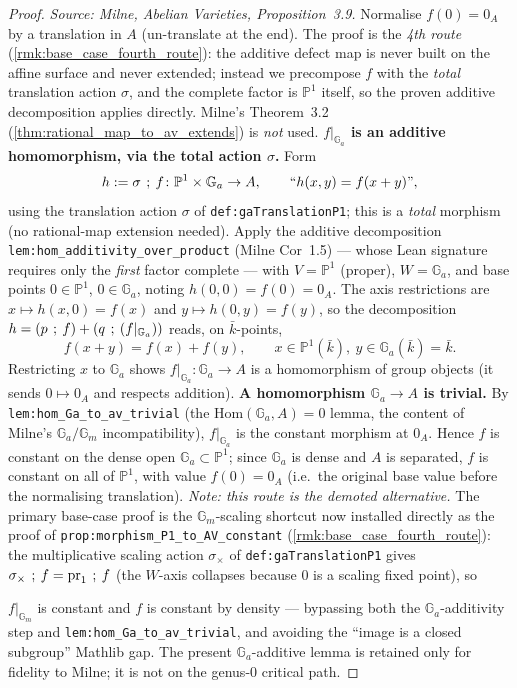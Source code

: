 \begin{proof}
  \textit{Source: Milne, Abelian Varieties, Proposition~3.9.}
  Normalise \(f(0) = 0_A\) by a translation in \(A\) (un-translate at the end). The proof is the
  \emph{4th route} (\cref{rmk:base_case_fourth_route}): the additive defect map is never built on
  the affine surface and never extended; instead we precompose \(f\) with the \emph{total}
  translation action \(\sigma\), and the complete factor is \(\mathbb P^1\) itself, so the proven
  additive decomposition applies directly. Milne's Theorem~3.2
  (\cref{thm:rational_map_to_av_extends}) is \emph{not} used.
  \textbf{\(f|_{\mathbb G_a}\) is an additive homomorphism, via the total action \(\sigma\).} Form
  \[ h := \sigma \fatsemi f \colon \mathbb P^1 \times \mathbb G_a \to A, \qquad
     \text{``}h(x, y) = f(x + y)\text{''}, \]
  using the translation action \(\sigma\) of \texttt{def:gaTranslationP1}; this is a \emph{total}
  morphism (no rational-map extension needed). Apply the additive decomposition
  \texttt{lem:hom_additivity_over_product} (Milne Cor~1.5) --- whose Lean signature requires only the
  \emph{first} factor complete --- with \(V = \mathbb P^1\) (proper), \(W = \mathbb G_a\), and base
  points \(0 \in \mathbb P^1\), \(0 \in \mathbb G_a\), noting \(h(0, 0) = f(0) = 0_A\). The axis
  restrictions are \(x \mapsto h(x, 0) = f(x)\) and \(y \mapsto h(0, y) = f(y)\), so the decomposition
  \(h = (p \fatsemi f) + (q \fatsemi (f|_{\mathbb G_a}))\) reads, on \(\bar k\)-points,
  \[ f(x + y) = f(x) + f(y), \qquad x \in \mathbb P^1(\bar k),\ y \in \mathbb G_a(\bar k) = \bar k. \]
  Restricting \(x\) to \(\mathbb G_a\) shows \(f|_{\mathbb G_a} \colon \mathbb G_a \to A\) is a
  homomorphism of group objects (it sends \(0 \mapsto 0_A\) and respects addition).
  \textbf{A homomorphism \(\mathbb G_a \to A\) is trivial.} By \texttt{lem:hom_Ga_to_av_trivial}
  (the \(\mathrm{Hom}(\mathbb G_a, A) = 0\) lemma, the content of Milne's \(\mathbb G_a/\mathbb G_m\)
  incompatibility), \(f|_{\mathbb G_a}\) is the constant morphism at \(0_A\). Hence \(f\) is constant on
  the dense open \(\mathbb G_a \subset \mathbb P^1\); since \(\mathbb G_a\) is dense and \(A\) is
  separated, \(f\) is constant on all of \(\mathbb P^1\), with value \(f(0) = 0_A\) (i.e.\ the original
  base value before the normalising translation). \qedhere
  \medskip
  \noindent\emph{Note: this route is the demoted alternative.} The primary base-case proof is the
  \(\mathbb G_m\)-scaling shortcut now installed directly as the proof of
  \texttt{prop:morphism_P1_to_AV_constant} (\cref{rmk:base_case_fourth_route}): the multiplicative
  scaling action \(\sigma_\times\) of \texttt{def:gaTranslationP1} gives \(\sigma_\times \fatsemi f =
  \mathrm{pr}_1 \fatsemi f\) (the \(W\)-axis collapses because \(0\) is a scaling fixed point), so
  
  \(f|_{\mathbb G_m}\) is constant and \(f\) is constant by density --- bypassing both the \(\mathbb
  G_a\)-additivity step and \texttt{lem:hom_Ga_to_av_trivial}, and avoiding the ``image is a closed
  subgroup'' Mathlib gap. The present \(\mathbb G_a\)-additive lemma is retained only for fidelity to
  Milne; it is not on the genus-\(0\) critical path.
\end{proof}
